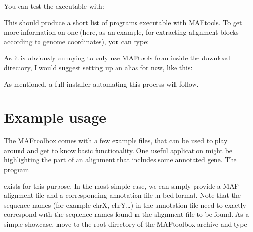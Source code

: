 \documentclass[letterpaper,10pt,english]{sphinxmanual}
\begin{document}
\sphinxAtStartPar
You can test the executable with:

\begin{sphinxVerbatim}[commandchars=\\\{\}]
\end{sphinxVerbatim}

\sphinxAtStartPar
This should produce a short list of programs executable with MAFtools. To get more
information on one (here, as an example, for extracting alignment blocks according to
genome coordinates), you can type:

\begin{sphinxVerbatim}[commandchars=\\\{\}]
\end{sphinxVerbatim}

\sphinxAtStartPar
As it is obviously annoying to only use MAFtools from inside the download directory,
I would suggest setting up an alias for now, like this:

\begin{sphinxVerbatim}[commandchars=\\\{\}]
\end{sphinxVerbatim}

\sphinxAtStartPar
As mentioned, a full installer automating this process will follow.


\chapter{Example usage}
\label{\detokenize{index:example-usage}}
\sphinxAtStartPar
The MAFtoolbox comes with a few example files, that can be used to play around
and get to know basic functionality. One useful application might be
highlighting the part of an alignment that includes some annotated gene.
The program

\begin{sphinxVerbatim}[commandchars=\\\{\}]
\end{sphinxVerbatim}

\sphinxAtStartPar
exists for this purpose. In the most simple case, we can simply provide a MAF
alignment file and a corresponding annotation file in bed format. Note that
the sequence names (for example chrX, chrY…) in the annotation file need to exactly correspond with
the sequence names found in the alignment file to be found.
As a simple showcase, move to the root directory of the MAFtoolbox archive and type
\end{document}
